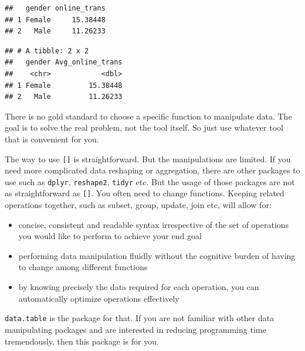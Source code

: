 \documentclass[]{book}
\newenvironment{Shaded}{\begin{snugshade}}{\end{snugshade}}
\newcommand{\KeywordTok}[1]{\textcolor[rgb]{0.13,0.29,0.53}{\textbf{{#1}}}}
\newcommand{\DataTypeTok}[1]{\textcolor[rgb]{0.13,0.29,0.53}{{#1}}}
\newcommand{\StringTok}[1]{\textcolor[rgb]{0.31,0.60,0.02}{{#1}}}
\newcommand{\NormalTok}[1]{{#1}}
\providecommand{\tightlist}{%
  \setlength{\itemsep}{0pt}\setlength{\parskip}{0pt}}
\theoremstyle{definition}
\theoremstyle{definition}
\theoremstyle{remark}
\begin{document}
\begin{verbatim}
##   gender online_trans
## 1 Female     15.38448
## 2   Male     11.26233
\end{verbatim}

\begin{Shaded}
\end{Shaded}

\begin{verbatim}
## # A tibble: 2 x 2
##   gender Avg_online_trans
##    <chr>            <dbl>
## 1 Female         15.38448
## 2   Male         11.26233
\end{verbatim}

There is no gold standard to choose a specific function to manipulate
data. The goal is to solve the real problem, not the tool itself. So
just use whatever tool that is convenient for you.

The way to use \texttt{{[}{]}} is straightforward. But the manipulations
are limited. If you need more complicated data reshaping or aggregation,
there are other packages to use such as \texttt{dplyr},
\texttt{reshape2}, \texttt{tidyr} etc. But the usage of those packages
are not as straightforward as \texttt{{[}{]}}. You often need to change
functions. Keeping related operations together, such as subset, group,
update, join etc, will allow for:

\begin{itemize}
\tightlist
\item
  concise, consistent and readable syntax irrespective of the set of
  operations you would like to perform to achieve your end goal
\item
  performing data manipulation fluidly without the cognitive burden of
  having to change among different functions
\item
  by knowing precisely the data required for each operation, you can
  automatically optimize operations effectively
\end{itemize}

\texttt{data.table} is the package for that. If you are not familiar
with other data manipulating packages and are interested in reducing
programming time tremendously, then this package is for you.
\end{document}
